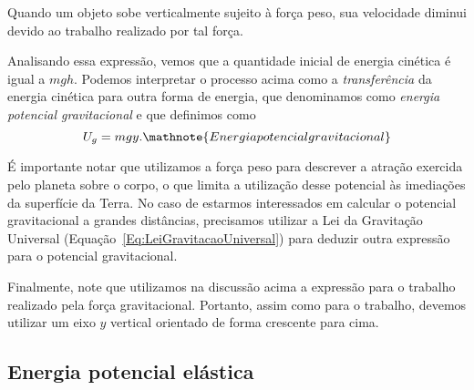 \begin{marginfigure}[-2cm]
\centering
{}
\caption{Quando um objeto sobe verticalmente sujeito à força peso, sua velocidade diminui devido ao trabalho realizado por tal força.}
\end{marginfigure}

Analisando essa expressão, vemos que a quantidade inicial de energia cinética é igual a $mgh$. Podemos interpretar o processo acima como a \emph{transferência} da energia cinética para outra forma de energia, que denominamos como \emph{energia potencial gravitacional} e que definimos como
\begin{equation}
  U_g = mgy. \mathnote{Energia potencial gravitacional}
\end{equation}

É importante notar que utilizamos a força peso para descrever a atração exercida pelo planeta sobre o corpo, o que limita a utilização desse potencial às imediações da superfície da Terra. No caso de estarmos interessados em calcular o potencial gravitacional a grandes distâncias, precisamos utilizar a Lei da Gravitação Universal (Equação~\eqref{Eq:LeiGravitacaoUniversal}) para deduzir outra expressão para o potencial gravitacional.

Finalmente, note que utilizamos na discussão acima a expressão para o trabalho realizado pela força gravitacional. Portanto, assim como para o trabalho, devemos utilizar um eixo $y$ vertical orientado de forma crescente para cima. 

\subsection{Energia potencial elástica}


